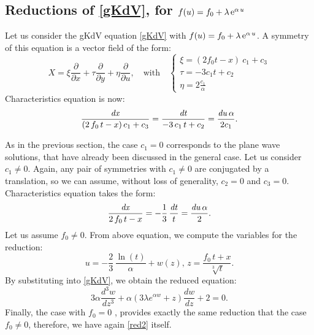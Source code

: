 \documentclass[
11pt,%
tightenlines,%
twoside,%
onecolumn,%
nofloats,%
nobibnotes,%
nofootinbib,%
superscriptaddress,%
noshowpacs,%
centertags]%
{revtex4}
\begin{document}
\subsection{Reductions of \eqref{gKdV}, for $f(u) =f_{0}+\lambda\,{{\rm e}^{\alpha\,u}}$}
Let us consider the gKdV equation \eqref{gKdV} with $f(u) = f_{0}+\lambda\,{{\rm e}^{\alpha\,u}}$. A symmetry of this equation is a vector field of the form:
\begin{equation}
X = \xi \frac{\partial}{\partial x} + \tau   \frac{\partial}{\partial y} + \eta  \frac{\partial}{\partial u}, \quad \mbox{with}\quad 
\begin{cases}
\xi =(2f_0t-x)\ c_1+c_3 \\
\tau = -3 c_1 t+c_2 \\
\eta =2 \frac{c_1}{\alpha}
\end{cases}
\end{equation}
Characteristics equation is now:
 \begin{equation}%
{\frac{{\it dx}}{\left(2\,f_{0}\,t-x\right)c_{1}+c_{3}}}={\frac{{\it dt}}{-3\,c_{1}\,t+c_{2}}}={\frac{{\it du}\,\alpha}{2c_{1}}}.
\end{equation}

As in the previous section, the case $c_1 = 0$ corresponds to the plane wave solutions, that have already been discussed in the general case. Let us consider $c_1 \neq 0$. Again, any pair of symmetries with $c_1 \neq 0$ are conjugated by a translation, so we can assume, without loss of generality, $c_{2}=0$  and $c_{3}=0$. Characteristics equation takes the form:
\begin{equation}%
{\frac{{\it dx}}{2\,f_{0}\,t-x}}=-\frac{1}{3}\,{\frac{{\it dt}}{t}}={\frac{{\it du}\,\alpha}{2}}.
   \end{equation}
Let us assume $ f_{0}\neq 0$. From above equation, we compute the variables for the reduction:
 \begin{equation}
  u=-\frac{2}{3}\,{\frac{\ln\left(t\right)}{\alpha}}+w\left(z\right),\,z={\frac{f_{0}\,t+x}{\sqrt[3]{t}}}.
\end{equation}
By substituting into \eqref{gKdV}, we obtain the reduced equation:
\begin{equation}\label{red2}
3\alpha \frac{d^3w}{dz^3}  +\alpha \left(3\lambda e^{\alpha w} + z \right) \frac{dw}{dz} + 2 = 0.
\end{equation}
Finally, the case with $f_0=0 $ , provides exactly the same reduction that the case $f_0\neq 0$, therefore, we have again \eqref{red2} itself.
 
\end{document}
